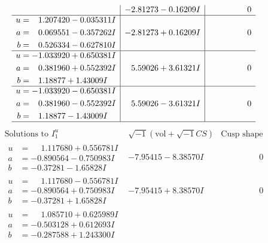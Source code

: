 \documentclass[1p]{elsarticle_modified}
\theoremstyle{definition}
\newcommand{\I}{\sqrt{-1}}
\begin{document}
$$\begin{array}{c|c|c}
 & -2.81273 - 0.16209 I & \phantom{-0.000000 } 0 \\ \hline\begin{aligned}
u &= \phantom{-}1.207420 - 0.035311 I \\
a &= \phantom{-}0.069551 - 0.357262 I \\
b &= \phantom{-}0.526334 - 0.627810 I\end{aligned}
 & -2.81273 + 0.16209 I & \phantom{-0.000000 } 0 \\ \hline\begin{aligned}
u &= -1.033920 + 0.650381 I \\
a &= \phantom{-}0.381960 + 0.552392 I \\
b &= \phantom{-}1.18877 + 1.43009 I\end{aligned}
 & \phantom{-}5.59026 + 3.61321 I & \phantom{-0.000000 } 0 \\ \hline\begin{aligned}
u &= -1.033920 - 0.650381 I \\
a &= \phantom{-}0.381960 - 0.552392 I \\
b &= \phantom{-}1.18877 - 1.43009 I\end{aligned}
 & \phantom{-}5.59026 - 3.61321 I & \phantom{-0.000000 } 0\\
 \hline 
 \end{array}$$\newpage$$\begin{array}{c|c|c}  
\text{Solutions to }I^u_{1}& \I (\text{vol} + \sqrt{-1}CS) & \text{Cusp shape}\\
 \hline 
\begin{aligned}
u &= \phantom{-}1.117680 + 0.556781 I \\
a &= -0.890564 - 0.750983 I \\
b &= -0.37281 - 1.65828 I\end{aligned}
 & -7.95415 - 8.38570 I & \phantom{-0.000000 } 0 \\ \hline\begin{aligned}
u &= \phantom{-}1.117680 - 0.556781 I \\
a &= -0.890564 + 0.750983 I \\
b &= -0.37281 + 1.65828 I\end{aligned}
 & -7.95415 + 8.38570 I & \phantom{-0.000000 } 0 \\ \hline\begin{aligned}
u &= \phantom{-}1.085710 + 0.625989 I \\
a &= -0.503128 + 0.612693 I \\
b &= -0.287588 + 1.243300 I\end{aligned}

\end{array}$$
\end{document}
